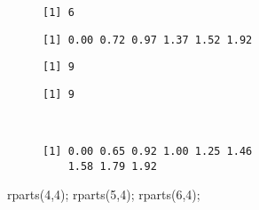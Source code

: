 \documentclass[
  letterpaper,
]{article}
\newenvironment{Shaded}{\begin{snugshade}}{\end{snugshade}}
\newcommand{\DecValTok}[1]{\textcolor[rgb]{0.68,0.00,0.00}{#1}}
\newcommand{\FunctionTok}[1]{\textcolor[rgb]{0.28,0.35,0.67}{#1}}
\newcommand{\NormalTok}[1]{\textcolor[rgb]{0.00,0.23,0.31}{#1}}
\begin{document}
\begin{figure}
\begin{minipage}{0.15\linewidth}
\begin{verbatim}
[1] 6
\end{verbatim}

\end{minipage}%
%
\begin{minipage}{0.70\linewidth}

\begin{verbatim}
[1] 0.00 0.72 0.97 1.37 1.52 1.92
\end{verbatim}

\end{minipage}%
\newline
\begin{minipage}{0.15\linewidth}

\begin{verbatim}
[1] 9
\end{verbatim}

\end{minipage}%
%
\begin{minipage}{0.15\linewidth}

\begin{verbatim}
[1] 9
\end{verbatim}

\end{minipage}%
%
\begin{minipage}{0.70\linewidth}

\begin{verbatim}


[1] 0.00 0.65 0.92 1.00 1.25 1.46 
    1.58 1.79 1.92
\end{verbatim}

\end{minipage}%

\end{figure}%

\begin{Shaded}
\begin{Highlighting}[]
\FunctionTok{rparts}\NormalTok{(}\DecValTok{4}\NormalTok{,}\DecValTok{4}\NormalTok{);     }\FunctionTok{rparts}\NormalTok{(}\DecValTok{5}\NormalTok{,}\DecValTok{4}\NormalTok{);     }\FunctionTok{rparts}\NormalTok{(}\DecValTok{6}\NormalTok{,}\DecValTok{4}\NormalTok{);}
\end{Highlighting}
\end{Shaded}
\end{document}
